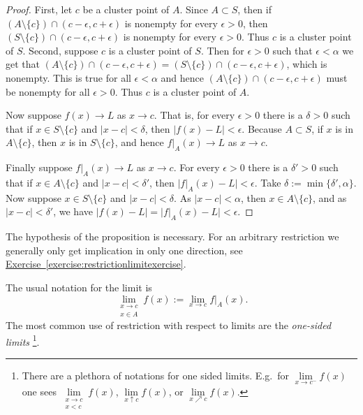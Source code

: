 \documentclass[12pt]{book}
\newcommand{\abs}[1]{\left\lvert {#1} \right\rvert}
\newcommand{\myindex}[1]{#1\index{#1}}
\theoremstyle{plain}
\theoremstyle{remark}
\theoremstyle{definition}
\theoremstyle{exercise}
\theoremstyle{example}
\newcommand{\exerciseref}[1]{\hyperref[#1]{Exercise~\ref*{#1}}}
\begin{document}
\begin{proof}
First, let $c$ be a cluster point of $A$.
Since $A \subset S$, then if $( A \setminus \{ c\} ) \cap
(c-\epsilon,c+\epsilon)$ is nonempty for every $\epsilon > 0$,
then $( S \setminus \{ c\} ) \cap
(c-\epsilon,c+\epsilon)$ is nonempty for every $\epsilon > 0$.
Thus $c$ is a cluster point of $S$.
Second, suppose $c$ is a cluster
point of $S$.  Then for $\epsilon > 0$ such that $\epsilon < \alpha$
we get that $( A \setminus \{ c\} ) \cap (c-\epsilon,c+\epsilon) =
( S \setminus \{ c\} ) \cap (c-\epsilon,c+\epsilon)$, which is nonempty.  This is true for all
$\epsilon < \alpha$ and hence 
$( A \setminus \{ c\} ) \cap (c-\epsilon,c+\epsilon)$ must be nonempty for all
$\epsilon > 0$.  Thus $c$ is a cluster point of $A$.

Now suppose $f(x) \to L$ as $x \to c$.  That is, for every $\epsilon > 0$
there is a $\delta > 0$ such that if $x \in S \setminus \{ c \}$
and $\abs{x-c} < \delta$, then $\abs{f(x)-L} < \epsilon$.  Because $A \subset S$,
if $x$ is in $A \setminus \{ c \}$, then $x$ is in $S \setminus \{ c
\}$, and hence $f|_A(x) \to L$ as $x \to c$.

Finally suppose $f|_A(x) \to L$ as $x \to c$.
For every $\epsilon > 0$
there is a $\delta' > 0$ such that if $x \in A \setminus \{ c \}$
and $\abs{x-c} < \delta'$, then $\bigl\lvert f|_A(x)-L \bigr\rvert < \epsilon$.
Take $\delta := \min \{ \delta', \alpha \}$.
Now suppose $x \in S \setminus \{ c \}$ and
$\abs{x-c} < \delta$.  As $\abs{x-c} < \alpha$, then $x \in A \setminus \{ c \}$,
and as $\abs{x-c} < \delta'$, 
we have $\abs{f(x)-L} = \bigl\lvert f|_A(x)-L
\bigr\rvert < \epsilon$.
\end{proof}

The hypothesis of the proposition is necessary.  For an arbitrary
restriction we generally only get implication in only one direction,
see \exerciseref{exercise:restrictionlimitexercise}.  

The usual notation for the limit is
\begin{equation*}
\lim_{\substack{x \to c\\x \in A}} f(x) := \lim_{x \to c} f|_A(x) .
\end{equation*}
The most common use of restriction with respect to limits
are the \emph{\myindex{one-sided limits}}%
\footnote{%
There are a plethora of notations for one sided limits.  E.g.\ for
$\lim\limits_{x \to c^-} f(x)$ one sees
$\lim\limits_{\substack{x \to c\\x < c}} f(x)$,
$\lim\limits_{x \uparrow c} f(x)$, or
$\lim\limits_{x \nearrow c} f(x)$.}.
\end{document}
